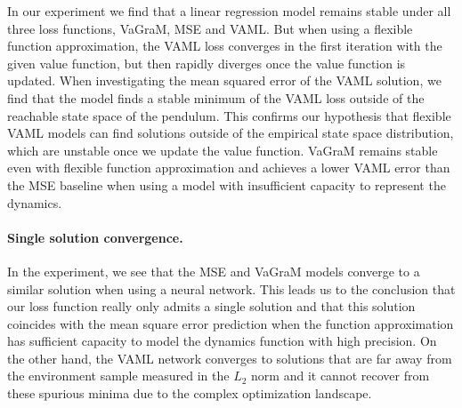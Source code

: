 In our experiment we find that a linear regression model remains stable under all three loss functions, VaGraM, MSE and VAML.
But when using a flexible function approximation, the VAML loss converges in the first iteration with the given value function, but then rapidly diverges once the value function is updated.
When investigating the mean squared error of the VAML solution, we find that the model finds a stable minimum of the VAML loss outside of the reachable state space of the pendulum.
This confirms our hypothesis that flexible VAML models can find solutions outside of the empirical state space distribution, which are unstable once we update the value function.
VaGraM remains stable even with flexible function approximation and achieves a lower VAML error than the MSE baseline when using a model with insufficient capacity to represent the dynamics.

\paragraph{Single solution convergence.}
In the experiment, we see that the MSE and VaGraM models converge to a similar solution when using a neural network. 
This leads us to the conclusion that our loss function really only admits a single solution and that this solution coincides with the mean square error prediction when the function approximation has sufficient capacity to model the dynamics function with high precision.
On the other hand, the VAML network converges to solutions that are far away from the environment sample measured in the $L_2$ norm and it cannot recover from these spurious minima due to the complex optimization landscape.


\section{}

